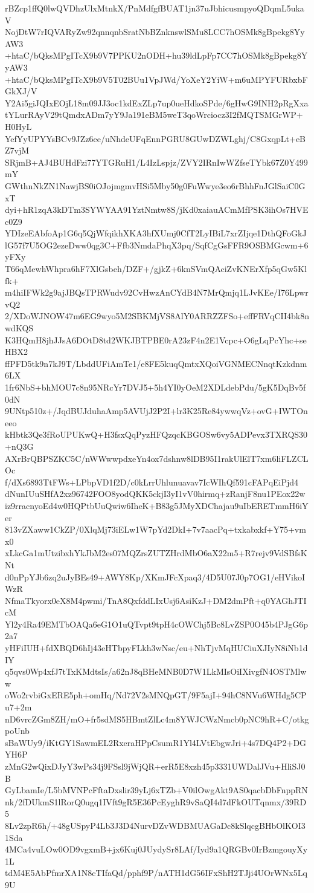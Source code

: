 rBZcp1ffQ0lwQVDhzUlxMtnkX/PnMdfgfBUAT1jn37uJbhicusmpyoQDqmL5ukaV
NojDtW7rIQVARyZw92qnnqnbSratNbBZnknswlSMu8LCC7hOSMk8gBpekg8YyAW3
+htaC/bQksMPgITcX9b9V7PPKU2nODH+hu39ldLpFp7CC7hOSMk8gBpekg8YyAW3
+htaC/bQksMPgITcX9b9V5T02BUu1VpJWd/YoXeY2YiW+m6uMPYFURbxbFGkXJ/V
Y2Ai5giJQIxEOjL18m09JJ3oc1kdExZLp7up0ueHdkoSPde/6gHwG9INH2pRgXxa
tYLurRAyV29tQmdxADm7yY9Ja191eBM5weT3qoWrciocz3I2fMQTSMGrWP+H0HyL
YefYyUPYYsBCv9JZz6ee/uNhdeUFqEnnPGRU8GUwDZWLghj/C8GxqpLt+eBZ7vjM
SRjmB+AJ4BUHdFzi77YTGRuH1/L4IzLspjz/ZVY2IRnIwWZfseTYbk67Z0Y499mY
GWthnNkZN1NawjBS0iOJojmgmvHSi5Mby50g0FuWwye3eo6rBhhFnJGlSaiC0GxT
dyi+hR1zqA3kDTm3SYWYAA91YztNmtw8S/jKd0xaiauACmMfPSK3ihOs7HVEc0Z9
YDIzeEAbfoAp1G6q5QjWfqikhXKA3hfXUmj0CfT2LyIBiL7xrZIjqe1DthQFoGkJ
lG57f7U5OG2ezeDww0qg3C+Ffb3NmdaPhqX3pq/SqfCgGsFFR9OSBMGcwm+6yFXy
T66qMewhWhpra6hF7XlGsbeh/DZF+/gjkZ+6knSVmQAciZvKNErXfp5qGw5Klfk+
m4hiIFWk2g9ajJBQsTPRWudv92CvHwzAnCYdB4N7MrQmjq1LJvKEe/I76LpwrvQ2
2/XDoWJNOW47m6EG9wyo5M2SBKMjVS8AlY0ARRZZFSo+effFRVqCII4bk8nwdKQS
K3HQmH8jhJJsA6DOtD8td2WKJBTPBE0rA23zF4n2E1Vcpc+O6gLqPcYhc+seHBX2
ffPFD5tk9n7kJ9T/LbddUFiAmTe1/e8FE5kuqQmtxXQoiVGNMECNnqtKzkdnm6LX
1fr6NbS+bhMOU7c8n95NRcYr7DVJ5+5h4YI0yOeM2XDLdebPdu/5gK5DqBv5f0dN
9UNtp510z+/JqdBUJduhaAmp5AVUjJ2P2I+lr3K25Re84ywwqVz+ovG+IWTOneeo
kHbtk3Qe3fRoUPUKwQ+H3fsxQqPyzHFQzqcKBGOSw6vy5ADPevx3TXRQS30+nQ3G
AXrBrQBPSZKC5C/nWWwwpdxeYn4ox7dshnw8lDB95I1rakUlElT7xm6liFLZCLOc
f/dXs6893TtFWs+LPbpVD1f2D/c0kLrrUhlunuavav7IcWIhQf591cFAPqEiPjd4
dNunIUuSHfA2xz96742FOO8yodQKK5ckjI3yI1vV0hirmq+zRanjF8nu1PEox22w
iz9rracnyoEd4w0HQPtbUuQwiw6IheK+B83g5JMyXDChajau9uIbERETmmH6iYer
813vZXaww1CkZP/0XlqMj73iELw1W7pYd2DkI+7v7aacPq+txkabxkf+Y75+vmx0
xLkcGa1mUtzibxhYkJbM2es07MQZrsZUTZHrdMbO6aX22m5+R7rejv9VdSBfsKNt
d0nPpYJb6zq2uJyBEs49+AWY8Kp/XKmJFcXpaq3/4D5U07J0p7OG1/eHVikoIWzR
NfmaTkyorx0eX8M4pwmi/TnA8QxfddLIxUsj6AsiKzJ+DM2dmPft+q0YAGhJTIcM
Yl2y4Ra49EMTbOAQa6eG1O1uQTvpt9tpH4cOWChj5Bc8LvZSP0O45b4PJgG6p2a7
yHFiIUH+fdXBQD6hIj43eHTbpyFLkh3wNsc/eu+NhTjvMqHUCiuXJIyN8iNb1dIY
q5qvs0Wp4xfJ7tTxKMdtsIs/a62nJ8qBHeMNB0D7W1LkMIsOiIXivgfN4OSTMlww
oWo2rvbiGxERE5ph+omHq/Nd72V2sMNQpGT/9F5ajI+94hC8NVu6WHdg5CPu7+2m
nD6vrcZGm8ZH/mO+fr5sdMS5HBmtZlLc4m8YWJCWzNmcb0pNC9hR+C/otkgpoUnb
sBaWUy9/iKtGY1SawmEL2RxeraHPpCsumR1Yl4LVtEbgwJri+4s7DQ4P2+DGYH6P
zMnG2wQixDJyY3wPs34j9FSsl9jWjQR+erR5E8xzh45p3331UWDalJVu+HliSJ0B
GyLbamIe/L5bMVNPcFftaDxslir39yLj6xTZb+V0ilOwgAkt9AS0qacbDbFnppRN
nk/2fDUkmS1lRorQ0ugq1IVft9gR5E36PcEyghR9vSaQI4d7dFkOUTqnmx/39RD5
8Lv2zpR6h/+48gUSpyP4Lb3J3D4NurvDZvWDBMUAGaDc8kSlqcgBHbOlKOI31Sda
4MCa4vuLOw0OD9vgxmB+jx6Kuj0JUydySr8LAf/Iyd9a1QRGBv0IrBzmgouyXy1L
tdM4E5AbPfmrXA1N8cTIfaQd/pphf9P/nATH1dG56IFxShH2TJji4UOrWNx5Lq9U
